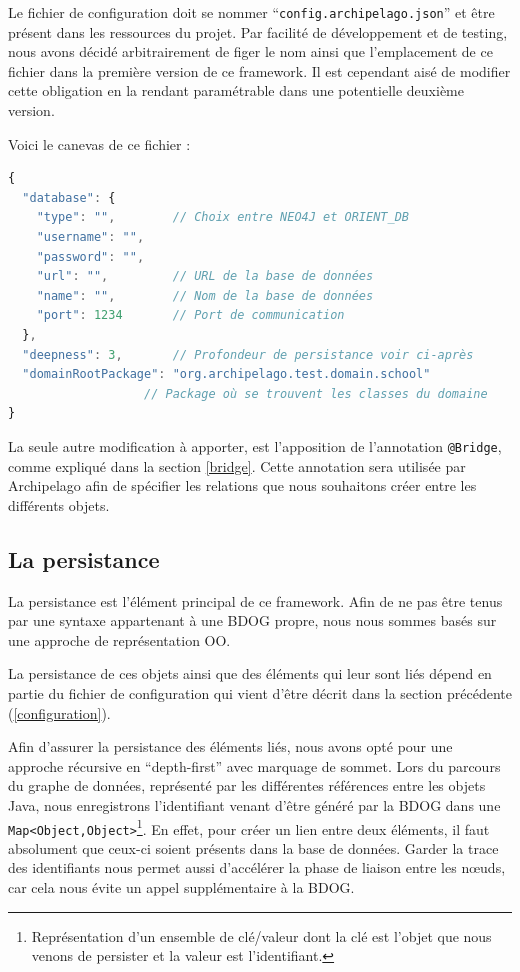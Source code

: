 \documentclass[a4paper,fleqn,12pt,oneside]{report}
\begin{document}
Le fichier de configuration doit se nommer \enquote{\texttt{config.archipelago.json}} et être présent dans les ressources du projet. Par facilité de développement et de testing, nous avons décidé arbitrairement de figer le nom ainsi que l'emplacement de ce fichier dans la première version de ce framework. Il est cependant aisé de modifier cette obligation en la rendant paramétrable dans une potentielle deuxième version.

Voici le canevas de ce fichier :

\begin{lstlisting}[language=JavaScript]
{
  "database": {
    "type": "",        // Choix entre NEO4J et ORIENT_DB
    "username": "",
    "password": "",
    "url": "",         // URL de la base de données
    "name": "",        // Nom de la base de données
    "port": 1234       // Port de communication
  },
  "deepness": 3,       // Profondeur de persistance voir ci-après
  "domainRootPackage": "org.archipelago.test.domain.school" 
                   // Package où se trouvent les classes du domaine 
}
\end{lstlisting}

La seule autre modification à apporter, est l'apposition de l'annotation \texttt{@Bridge}, comme expliqué dans la section \ref{bridge}. Cette annotation sera utilisée par Archipelago afin de spécifier les relations que nous souhaitons créer entre les différents objets.

\subsection{La persistance}
\label{persistance}

La persistance est l'élément principal de ce framework. Afin de ne pas être tenus par une syntaxe appartenant à une BDOG propre, nous nous sommes basés sur une approche de représentation OO. 

La persistance de ces objets ainsi que des éléments qui leur sont liés dépend en partie du fichier de configuration qui vient d'être décrit dans la section précédente (\ref{configuration}). 

Afin d'assurer la persistance des éléments liés, nous avons opté pour une approche récursive en \enquote{depth-first} avec marquage de sommet. Lors du parcours du graphe de données, représenté par les différentes références entre les objets Java, nous enregistrons l'identifiant venant d'être généré par la BDOG dans une \texttt{Map<Object,Object>}\footnote{Représentation d'un ensemble de clé/valeur dont la clé est l'objet que nous venons de persister et la valeur est  l'identifiant.}. En effet, pour créer un lien entre deux éléments, il faut absolument que ceux-ci soient présents dans la base de données. Garder la trace des identifiants nous permet aussi d'accélérer la phase de liaison entre les nœuds, car cela nous évite un appel supplémentaire à la BDOG.
\end{document}
